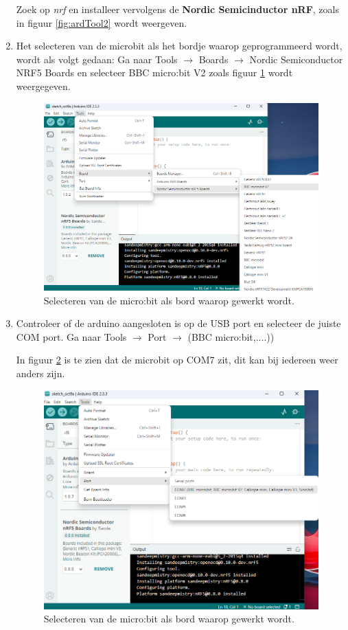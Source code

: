 \begin{enumerate}
\begin{figure}[h!]
\end{figure}
Zoek op \textit{nrf} en installeer vervolgens de \textbf{Nordic Semicinductor nRF}, zoals in figuur \ref{fig:ardTool2} wordt weergeven.

\item Het selecteren van de microbit als het bordje waarop geprogrammeerd wordt, wordt als volgt gedaan: Ga naar Tools $\rightarrow$ Boards $\rightarrow$ Nordic Semiconductor NRF5 Boards en selecteer BBC micro:bit V2 zoals figuur \ref{fig:ardTool3} wordt weergegeven.
\begin{figure}[H]
	\captionsetup{justification=centering}
	\includegraphics[width=0.60 \linewidth]{figuren/arduinoTools3}
	\centering
	\caption{Selecteren van de micro:bit als bord waarop gewerkt wordt.}
	\label{fig:ardTool3}
\end{figure}

\item Controleer of de arduino aangesloten is op de USB port en selecteer de juiste COM port. Ga naar Tools $\rightarrow$ Port $\rightarrow$ (BBC micro:bit,....))

In figuur \ref{fig:ardTool4} is te zien dat de microbit op COM7 zit, dit kan bij iedereen weer anders zijn.
\begin{figure}[H]
	\captionsetup{justification=centering}
	\includegraphics[width=0.60 \linewidth]{figuren/arduinoTools4}
	\centering
	\caption{Selecteren van de micro:bit als bord waarop gewerkt wordt.}
	\label{fig:ardTool4}
\end{figure}


\end{enumerate}
